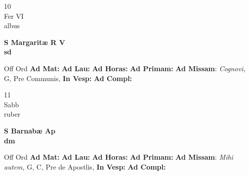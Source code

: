 \documentclass[10pt, openany]{book}
\begin{document}
        \begin{center}
            \begin{minipage}{3.5in}
                \vspace{2em}
                \begin{minipage}{0.5in}
                    {\Huge 10} \\
                    {\normalsize Fer VI} \\
                    {\normalsize albus}
                \end{minipage}
                \begin{minipage}{3.0in}
                    \textbf{ \large S Margaritæ R V \\
                    \textnormal{\normalsize sd}} \\ 
                \end{minipage}
                \begin{justify}Off Ord
                    \textbf{Ad Mat: }
                    \textbf{Ad Lau: }
                    \textbf{Ad Horas: }
                    \textbf{Ad Primam: }\textbf{Ad Missam}: \textit{Cognovi,} G, Pre Communis,  
                    \textbf{In Vesp: }
                    \textbf{Ad Compl: }
                \end{justify}
            \end{minipage}
        \end{center}
    
        \begin{center}
            \begin{minipage}{3.5in}
                \vspace{2em}
                \begin{minipage}{0.5in}
                    {\Huge 11} \\
                    {\normalsize Sabb} \\
                    {\normalsize ruber}
                \end{minipage}
                \begin{minipage}{3.0in}
                    \textbf{ \large S Barnabæ Ap \\
                    \textnormal{\normalsize dm}} \\ 
                \end{minipage}
                \begin{justify}Off Ord
                    \textbf{Ad Mat: }
                    \textbf{Ad Lau: }
                    \textbf{Ad Horas: }
                    \textbf{Ad Primam: }\textbf{Ad Missam}: \textit{Mihi autem,} G, C, Pre de Apostlis,  
                    \textbf{In Vesp: }
                    \textbf{Ad Compl: }
                \end{justify}
            \end{minipage}
        \end{center}
    
\end{document}
